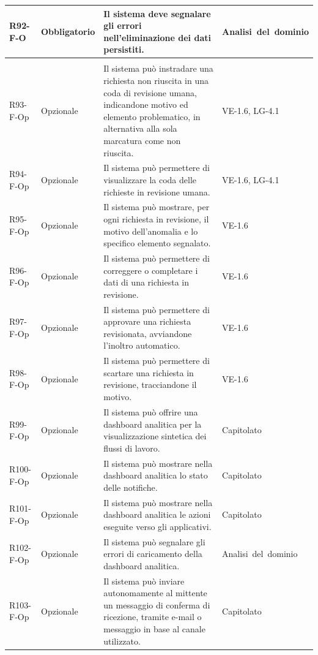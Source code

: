 {\begin{longtable}{|>{\raggedright\arraybackslash}p{1.8cm}|>{\raggedright\arraybackslash}p{2.3cm}|>{\raggedright\arraybackslash}p{6.6cm}|>{\raggedright\arraybackslash}p{3.1cm}|}
    \mbox{R92-F-O} & Obbligatorio & Il sistema deve segnalare gli errori nell'eliminazione dei dati persistiti. & \mbox{Analisi del dominio} \\ \hline
    \multicolumn{4}{|l|}{\cellcolor[gray]{0.94}\textbf{Macroarea 7 --- Funzionalità opzionali ed estensioni}} \\ \hline
    \mbox{R93-F-Op} & Opzionale & Il sistema può instradare una richiesta non riuscita in una coda di revisione umana, indicandone motivo ed elemento problematico, in alternativa alla sola marcatura come non riuscita. & \mbox{VE-1.6}, \mbox{LG-4.1} \\ \hline
    \mbox{R94-F-Op} & Opzionale & Il sistema può permettere di visualizzare la coda delle richieste in revisione umana. & \mbox{VE-1.6}, \mbox{LG-4.1} \\ \hline
    \mbox{R95-F-Op} & Opzionale & Il sistema può mostrare, per ogni richiesta in revisione, il motivo dell'anomalia e lo specifico elemento segnalato. & \mbox{VE-1.6} \\ \hline
    \mbox{R96-F-Op} & Opzionale & Il sistema può permettere di correggere o completare i dati di una richiesta in revisione. & \mbox{VE-1.6} \\ \hline
    \mbox{R97-F-Op} & Opzionale & Il sistema può permettere di approvare una richiesta revisionata, avviandone l'inoltro automatico. & \mbox{VE-1.6} \\ \hline
    \mbox{R98-F-Op} & Opzionale & Il sistema può permettere di scartare una richiesta in revisione, tracciandone il motivo. & \mbox{VE-1.6} \\ \hline
    \mbox{R99-F-Op} & Opzionale & Il sistema può offrire una dashboard analitica per la visualizzazione sintetica dei flussi di lavoro. & \mbox{Capitolato} \\ \hline
    \mbox{R100-F-Op} & Opzionale & Il sistema può mostrare nella dashboard analitica lo stato delle notifiche. & \mbox{Capitolato} \\ \hline
    \mbox{R101-F-Op} & Opzionale & Il sistema può mostrare nella dashboard analitica le azioni eseguite verso gli applicativi. & \mbox{Capitolato} \\ \hline
    \mbox{R102-F-Op} & Opzionale & Il sistema può segnalare gli errori di caricamento della dashboard analitica. & \mbox{Analisi del dominio} \\ \hline
    \mbox{R103-F-Op} & Opzionale & Il sistema può inviare autonomamente al mittente un messaggio di conferma di ricezione, tramite e-mail o messaggio in base al canale utilizzato. & \mbox{Capitolato} \\ \hline

\end{longtable}}
